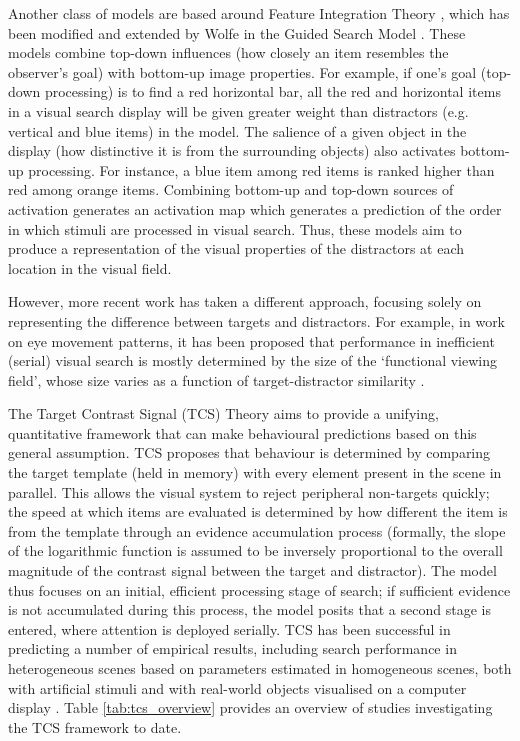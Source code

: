 \documentclass[smallextended, natbib]{svjour3}       %
\begin{document}
Another class of models are based around Feature Integration Theory \citep{treisman1980feature}, which has been modified and extended by Wolfe in the Guided Search Model \citep{wolfe1989guided,wolfe2014approaches}. These models combine top-down influences (how closely an item resembles the observer's goal) with bottom-up image properties. For example, if one's goal (top-down processing) is to find a red horizontal bar, all the red and horizontal items in a visual search display will be given greater weight than distractors (e.g. vertical and blue items) in the model. The salience of a given object in the display (how distinctive it is from the surrounding objects) also activates bottom-up processing. For instance, a blue item among red items is ranked higher than red among orange items. Combining bottom-up and top-down sources of activation generates an activation map which generates a prediction of the order in which stimuli are processed in visual search. Thus, these models aim to produce a representation of the visual properties of the distractors at each location in the visual field. 
 
However, more recent work has taken a different approach, focusing solely on representing the difference between targets and distractors. For example, in work on eye movement patterns, it has been proposed that performance in inefficient (serial) visual search is mostly determined by the size of the `functional viewing field', whose size varies as a function of target-distractor similarity \citep{hulleman2017brink}. 

The Target Contrast Signal (TCS) Theory \citep{lleras2020target} aims to provide a unifying, quantitative framework that can make behavioural predictions based on this general assumption. TCS proposes that behaviour is determined by comparing the target template (held in memory) with every element present in the scene in parallel. This allows the visual system to reject peripheral non-targets quickly; the speed at which items are evaluated is determined by how different the item is from the template through an evidence accumulation process (formally, the slope of the logarithmic function is assumed to be inversely proportional to the overall magnitude of the contrast signal between the target and distractor). The model thus focuses on an initial, efficient processing stage of search; if sufficient evidence is not accumulated during this process, the model posits that a second stage is entered, where attention is deployed serially. TCS has been successful in predicting a number of empirical results, including search performance in heterogeneous scenes based on parameters estimated in homogeneous scenes, both with artificial stimuli \citep{buetti2016towards,lleras2019predicting} and with real-world objects visualised on a computer display \citep{wang2017predicting}. Table \ref{tab:tcs_overview} provides an overview of studies investigating the TCS framework to date.
 
\end{document}
